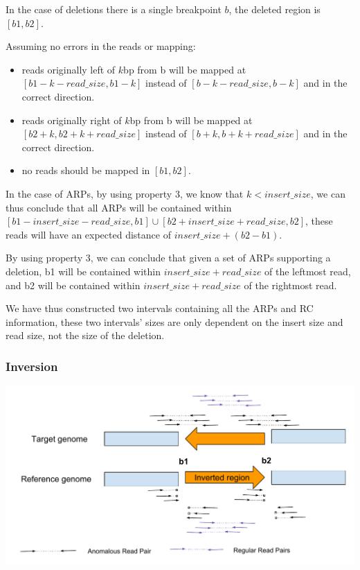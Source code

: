 \documentclass{article}
\begin{document}
In the case of deletions there is a single breakpoint $b$, the deleted region is $[b1, b2]$.

Assuming no errors in the reads or mapping:
\begin{itemize}
    \item reads originally left of $k$bp from b will be mapped at $[b1 - k - read\_size, b1 - k]$ instead of $[b - k - read\_size, b - k]$ and in the correct direction.
    \item reads originally right of $k$bp from b will be mapped at $[b2 + k, b2 + k + read\_size]$ instead of $[b + k, b + k + read\_size]$ and in the correct direction.
    \item no reads should be mapped in $[b1, b2]$.
\end{itemize}

In the case of ARPs, by using property 3, we know that $k < insert\_size$, we can thus conclude that all ARPs will be contained within $[b1 - insert\_size - read\_size, b1] \cup [b2 + insert\_size + read\_size, b2]$,
these reads will have an expected distance of $insert\_size + (b2 - b1)$.

By using property 3, we can conclude that given a set of ARPs supporting a deletion, b1 will be contained within $insert\_size + read\_size$ of the leftmost read, and b2 will be contained within $insert\_size + read\_size$ of the rightmost read.

We have thus constructed two intervals containing all the ARPs and RC information, these two intervals' sizes are only dependent on the insert size and read size, not the size of the deletion. 

\subsubsection{Inversion} 

\includegraphics[width=\textwidth]{InversionReadPairs}
\end{document}
